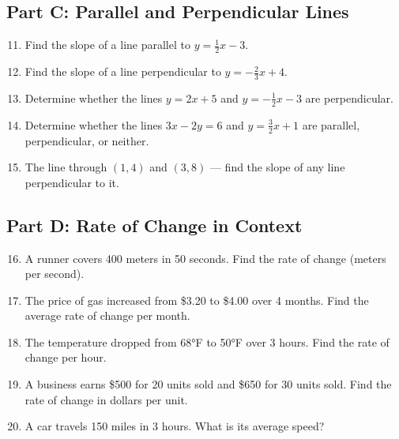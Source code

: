 \documentclass[14pt]{extarticle}
\begin{document}
\subsection*{Part C: Parallel and Perpendicular Lines}
\begin{enumerate}
    \setcounter{enumi}{10}
    \item Find the slope of a line parallel to \(y = \tfrac{1}{2}x - 3\).
    \item Find the slope of a line perpendicular to \(y = -\tfrac{2}{3}x + 4\).
    \item Determine whether the lines \(y = 2x + 5\) and \(y = -\tfrac{1}{2}x - 3\) are perpendicular.
    \item Determine whether the lines \(3x - 2y = 6\) and \(y = \tfrac{3}{2}x + 1\) are parallel, perpendicular, or neither.
    \item The line through \((1, 4)\) and \((3, 8)\) — find the slope of any line perpendicular to it.
\end{enumerate}

\subsection*{Part D: Rate of Change in Context}
\begin{enumerate}
    \setcounter{enumi}{15}
    \item A runner covers 400 meters in 50 seconds. Find the rate of change (meters per second).
    \item The price of gas increased from \$3.20 to \$4.00 over 4 months. Find the average rate of change per month.
    \item The temperature dropped from 68°F to 50°F over 3 hours. Find the rate of change per hour.
    \item A business earns \$500 for 20 units sold and \$650 for 30 units sold. Find the rate of change in dollars per unit.
    \item A car travels 150 miles in 3 hours. What is its average speed?
\end{enumerate}
\end{document}
